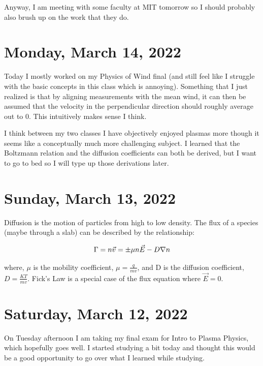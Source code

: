 \documentclass[12pt]{article}
\begin{document}
\par
Anyway, I am meeting with some faculty at MIT tomorrow so I should probably also brush up on the work that they do.

\section{Monday, March 14, 2022}

\par
Today I mostly worked on my Physics of Wind final (and still feel like I struggle with the basic concepts in this class which is annoying). Something that I just realized is that by aligning measurements with the mean wind, it can then be assumed that the velocity in the perpendicular direction should roughly average out to 0. This intuitively makes sense I think.

\par
I think between my two classes I have objectively enjoyed plasmas more though it seems like a conceptually much more challenging subject.  I learned that the Boltzmann relation and the diffusion coefficients can both be derived, but I want to go to bed so I will type up those derivations later. 

\section{Sunday, March 13, 2022}

\par
Diffusion is the motion of particles from high to low density. The flux of a species (maybe through a slab) can be described by the relationship:

\begin{equation}
\centering
\Gamma = n \vec{v} = \pm \mu n \vec{E} - D \nabla n 
\end{equation}

where, $\mu$ is the mobility coefficient, $\mu = \frac{q}{mv}$, and D is the diffusion coefficient, $D = \frac{KT}{mv}$. Fick's Law is a special case of the flux equation where $\vec{E} = 0$.

\par


\section{Saturday, March 12, 2022}

\par
On Tuesday afternoon I am taking my final exam for Intro to Plasma Physics, which hopefully goes well.  I started studying a bit today and thought this would be a good opportunity to go over what I learned while studying. 
\end{document}
